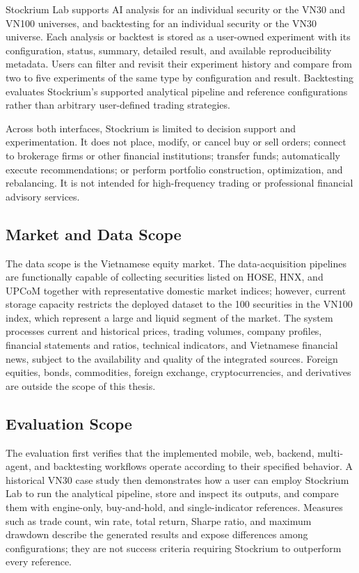 Stockrium Lab supports AI analysis for an individual security or the VN30 and VN100 universes, and backtesting for an individual security or the VN30 universe. Each analysis or backtest is stored as a user-owned experiment with its configuration, status, summary, detailed result, and available reproducibility metadata. Users can filter and revisit their experiment history and compare from two to five experiments of the same type by configuration and result. Backtesting evaluates Stockrium's supported analytical pipeline and reference configurations rather than arbitrary user-defined trading strategies.

Across both interfaces, Stockrium is limited to decision support and experimentation. It does not place, modify, or cancel buy or sell orders; connect to brokerage firms or other financial institutions; transfer funds; automatically execute recommendations; or perform portfolio construction, optimization, and rebalancing. It is not intended for high-frequency trading or professional financial advisory services.

\subsection{Market and Data Scope}

The data scope is the Vietnamese equity market. The data-acquisition pipelines are functionally capable of collecting securities listed on HOSE, HNX, and UPCoM together with representative domestic market indices; however, current storage capacity restricts the deployed dataset to the 100 securities in the VN100 index, which represent a large and liquid segment of the market. The system processes current and historical prices, trading volumes, company profiles, financial statements and ratios, technical indicators, and Vietnamese financial news, subject to the availability and quality of the integrated sources. Foreign equities, bonds, commodities, foreign exchange, cryptocurrencies, and derivatives are outside the scope of this thesis.

\subsection{Evaluation Scope}

The evaluation first verifies that the implemented mobile, web, backend, multi-agent, and backtesting workflows operate according to their specified behavior. A historical VN30 case study then demonstrates how a user can employ Stockrium Lab to run the analytical pipeline, store and inspect its outputs, and compare them with engine-only, buy-and-hold, and single-indicator references. Measures such as trade count, win rate, total return, Sharpe ratio, and maximum drawdown describe the generated results and expose differences among configurations; they are not success criteria requiring Stockrium to outperform every reference.

